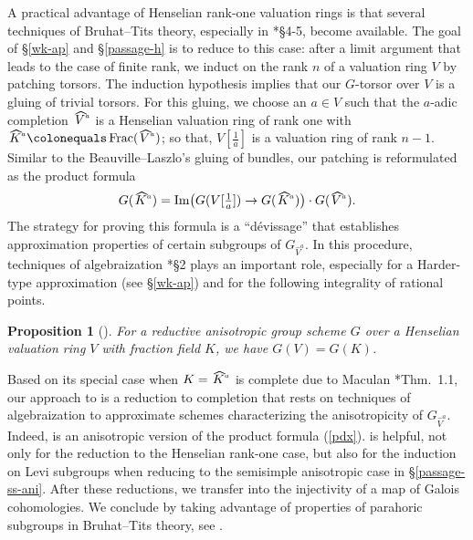 \documentclass[a4paper,11pt,reqno]{amsart}
\newcommand{\ra}{\rightarrow}
\newcommand{\wh}{\widehat}
\newcommand{\ce}{\colonequals}
\newcommand{\hva}{\!\stackon[-8pt]{\;$V^{\raisebox{1pt}{$\mathsmaller{\mathsmaller{a}}$}}$}{\vstretch{1.5}{\hstretch{1.7}{\widehat{\phantom{}}}}}}
\newcommand{\hka}{\!\stackon[-8pt]{\;$K^{\raisebox{1pt}{$\mathsmaller{\mathsmaller{a}}$}}$}{\vstretch{1.5}{\hstretch{1.7}{\widehat{\phantom{}}}}}}
\newcommand{\via}{V{[\f{1}{a}]}}
\newcommand{\nhva}{\wh{V}^a}
\providecommand{\f}[2]{\frac{#1}{#2}}
\DeclareMathOperator{\Frac}{Frac}		                       %
\newcommand{\bprop}{\begin{prop}}
\newcommand{\eprop}{\end{prop}}
\newcommand{\tst}{\textstyle}
\theoremstyle{plain}
\newtheorem{prop}[numberingbase]{Proposition}
\theoremstyle{remark}
\theoremstyle{definition}
\theoremstyle{plain}
\theoremstyle{definition}
\theoremstyle{subsection-tweak}
\theoremstyle{subsection-tweak}
\numberwithin{equation}{subsection}
\begin{document}
      
      A practical advantage of Henselian rank-one valuation rings is that several techniques of Bruhat--Tits theory, especially in \cite{BrT2}*{\S4-5}, become available.
      The goal of \S\ref{wk-ap} and \S\ref{passage-h} is to reduce  to this case: after a limit argument that leads to the case of finite rank, we induct on the rank $n$ of a valuation ring $V$ by patching torsors.
      The induction hypothesis implies that our $G$-torsor over $V$ is a gluing of trivial torsors.
      For this gluing, we choose an $a\in V$ such that the $a$-adic completion $\hva$ is a Henselian valuation ring of rank one with $\hka\ce \Frac(\hva)$; so that, $\via$ is a valuation ring of rank $n-1$.
      Similar to the Beauville--Laszlo's gluing of bundles, our patching is reformulated as the product formula
      \begin{equation}\label{pdx}
          \tst G(\hka)=\mathrm{Im}\bigl(G(\via)\ra G(\hka)\bigr)\cdot G(\hva).
      \end{equation}
      The strategy for proving this formula is a ``d\'evissage'' that establishes approximation properties of certain subgroups of $G_{\nhva}$.
      In this procedure, techniques of algebraization \cite{BC20}*{\S2} plays an important role, especially for a Harder-type approximation (see \S\ref{wk-ap}) and for the following integrality of rational points.
      \bprop[]\label{a-i-r}
      For a reductive anisotropic group scheme $G$ over a Henselian valuation ring $V$ with fraction field $K$, we have $ G(V)=G(K)$.
      \eprop
      Based on its special case when $K=\hka$ is complete due to Maculan \cite{Mac17}*{Thm.~1.1}, our approach to  is a reduction to completion that rests on techniques of algebraization to approximate schemes characterizing the anisotropicity of $G_{\nhva}$. 
      Indeed,  is an anisotropic version of the product formula (\ref{pdx}).
       is helpful, not only for the reduction to the Henselian rank-one case, but also for the induction on Levi subgroups when reducing to the semisimple anisotropic case in \S\ref{passage-ss-ani}.
      After these reductions, we transfer  into the injectivity of a map of Galois cohomologies.
      We conclude by taking advantage of properties of parahoric subgroups in Bruhat--Tits theory, see .
      
\end{document}
